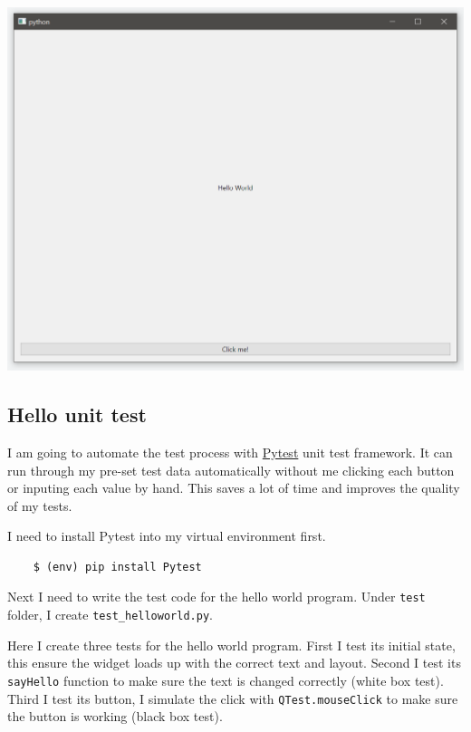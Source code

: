 \documentclass{report}
\begin{document}
\includegraphics[width=\linewidth]{Hello-World.png}

\subsection{Hello unit test}

I am going to automate the test process with \href{https://docs.pytest.org/}{Pytest} unit test framework. It can run through my pre-set test data automatically without me clicking each button or inputing each value by hand. This saves a lot of time and improves the quality of my tests.

I need to install Pytest into my virtual environment first.

\begin{verbatim}
    $ (env) pip install Pytest
\end{verbatim}

Next I need to write the test code for the hello world program. Under \texttt{test} folder, I create \texttt{test_helloworld.py}.

Here I create three tests for the hello world program. First I test its initial state, this ensure the widget loads up with the correct text and layout. Second I test its \texttt{sayHello} function to make sure the text is changed correctly (white box test). Third I test its button, I simulate the click with \texttt{QTest.mouseClick} to make sure the button is working (black box test).

\inputminted{python}{../tests/test_helloworld.py}
\end{document}
